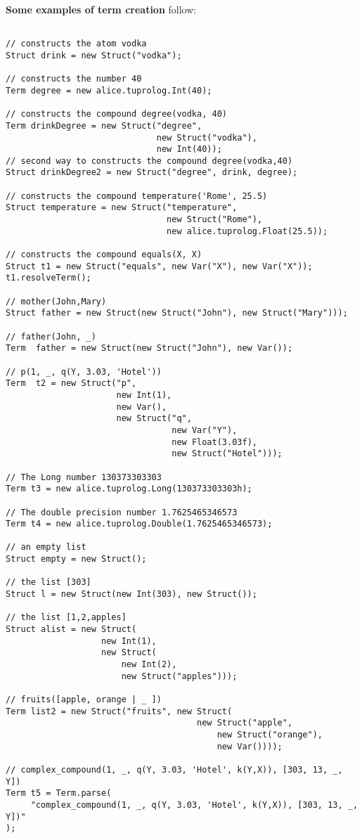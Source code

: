 \noindent \textbf{Some examples of term creation} follow:
%
{\small{\begin{verbatim}

// constructs the atom vodka
Struct drink = new Struct("vodka");

// constructs the number 40
Term degree = new alice.tuprolog.Int(40);

// constructs the compound degree(vodka, 40)
Term drinkDegree = new Struct("degree",
                              new Struct("vodka"),
                              new Int(40));
// second way to constructs the compound degree(vodka,40)
Struct drinkDegree2 = new Struct("degree", drink, degree);

// constructs the compound temperature('Rome', 25.5)
Struct temperature = new Struct("temperature",
                                new Struct("Rome"),
                                new alice.tuprolog.Float(25.5));

// constructs the compound equals(X, X)
Struct t1 = new Struct("equals", new Var("X"), new Var("X"));
t1.resolveTerm();

// mother(John,Mary)
Struct father = new Struct(new Struct("John"), new Struct("Mary")));

// father(John, _)
Term  father = new Struct(new Struct("John"), new Var());

// p(1, _, q(Y, 3.03, 'Hotel'))
Term  t2 = new Struct("p",
                      new Int(1),
                      new Var(),
                      new Struct("q",
                                 new Var("Y"),
                                 new Float(3.03f),
                                 new Struct("Hotel")));

// The Long number 130373303303
Term t3 = new alice.tuprolog.Long(130373303303h);

// The double precision number 1.7625465346573
Term t4 = new alice.tuprolog.Double(1.7625465346573);

// an empty list
Struct empty = new Struct();

// the list [303]
Struct l = new Struct(new Int(303), new Struct());

// the list [1,2,apples]
Struct alist = new Struct(
                   new Int(1),
                   new Struct(
                       new Int(2),
                       new Struct("apples")));

// fruits([apple, orange | _ ])
Term list2 = new Struct("fruits", new Struct(
                                      new Struct("apple",
                                          new Struct("orange"),
                                          new Var())));

// complex_compound(1, _, q(Y, 3.03, 'Hotel', k(Y,X)), [303, 13, _, Y])
Term t5 = Term.parse(
     "complex_compound(1, _, q(Y, 3.03, 'Hotel', k(Y,X)), [303, 13, _, Y])"
);

\end{verbatim}}}
